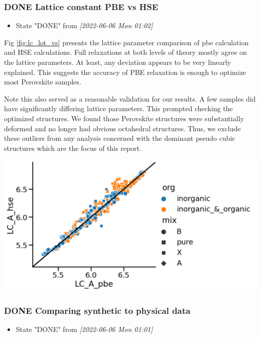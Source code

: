 \documentclass[twoside, twocolumn, 9pt, draft]{article}
\begin{document}
\subsubsection*{{\bfseries\sffamily DONE} Lattice constant PBE vs HSE}
\label{sec:org3cef15f}
\begin{itemize}
\item State "DONE"       from              \textit{[2022-06-06 Mon 01:02]}
\end{itemize}
Fig \ref{fig:lc_lot_vs} presents the lattice parameter comparison of
\acrlong{pbe} calculation and HSE calculations. Full
relaxations at both levels of theory mostly agree on the lattice
parameters. At least, any deviation appears to be very linearly
explained. This suggests the accuracy of PBE relaxation is enough to
optimize most Perovskite samples.

Note this also served as a reasonable validation for our results. A
few samples did have significantly differing lattice parameters. This
prompted checking the optimized structures. We found those Perovskite
structures were substantially deformed and no longer had obvious
octahedral structures. Thus, we exclude these outliers from any
analysis concerned with the dominant pseudo cubic structures which are
the focus of this report.

\begin{center}
\includegraphics[width=.9\linewidth]{pbe_v_hse_LC.png}
\end{center}

\subsubsection*{{\bfseries\sffamily DONE} Comparing synthetic to physical data}
\label{sec:org76abcdb}
\begin{itemize}
\item State "DONE"       from              \textit{[2022-06-06 Mon 01:01]}
\end{itemize}
\end{document}
